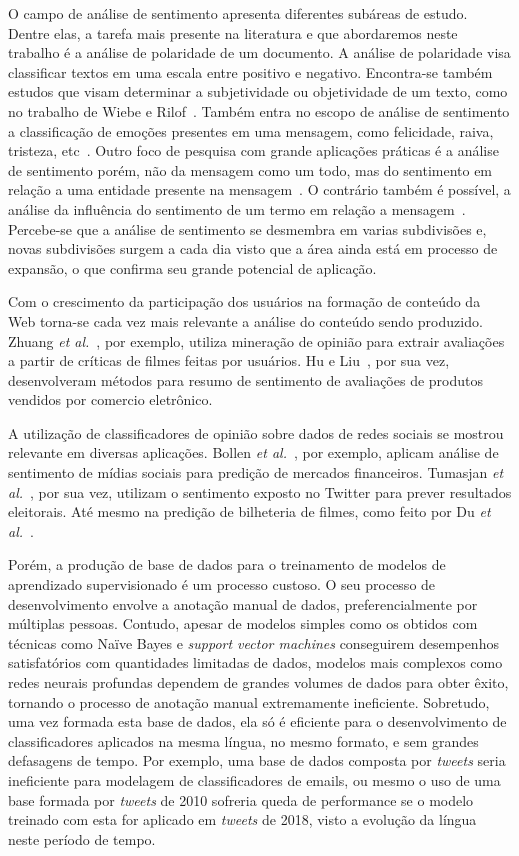 O campo de análise de sentimento apresenta diferentes subáreas de estudo.
Dentre elas, a tarefa mais presente na literatura e que abordaremos neste trabalho é a análise de polaridade de um
documento.
A análise de polaridade visa classificar textos em uma escala entre positivo e negativo.
Encontra-se também estudos que visam determinar a subjetividade ou objetividade de um texto, como no trabalho de Wiebe e
Rilof~\cite{Wiebe05}.
Também entra no escopo de análise de sentimento a classificação de emoções presentes em uma mensagem, como felicidade,
raiva, tristeza, etc~\cite{bollen11b}.
Outro foco de pesquisa com grande aplicações práticas é a análise de sentimento porém, não da mensagem como um todo, mas
do sentimento em relação a uma entidade presente na mensagem~\cite{eirinaki12}.
O contrário também é possível, a análise da influência do sentimento de um termo em relação a mensagem~\cite{socher13}.
Percebe-se que a análise de sentimento se desmembra em varias subdivisões e, novas subdivisões surgem a cada dia visto
que a área ainda está em processo de expansão, o que confirma seu grande potencial de aplicação.

Com o crescimento da participação dos usuários na formação de conteúdo da Web torna-se cada vez mais relevante a análise
do conteúdo sendo produzido.
Zhuang \textit{et al.}~\cite{zhuang06}, por exemplo, utiliza mineração de opinião para extrair avaliações a partir de
críticas de filmes feitas por usuários.
Hu e Liu~\cite{hu04}, por sua vez, desenvolveram métodos para resumo de sentimento de avaliações de produtos vendidos
por comercio eletrônico.

A utilização de classificadores de opinião sobre dados de redes sociais se mostrou relevante em diversas aplicações.
Bollen \textit{et al.}~\cite{bollen11}, por exemplo, aplicam análise de sentimento de mídias sociais para predição de
mercados financeiros.
Tumasjan \textit{et al.}~\cite{tumasjan10}, por sua vez, utilizam o sentimento exposto no Twitter para prever resultados
eleitorais.
Até mesmo na predição de bilheteria de filmes, como feito por Du \textit{et al.}~\cite{du14}.

Porém, a produção de base de dados para o treinamento de modelos de aprendizado supervisionado é um processo custoso.
O seu processo de desenvolvimento envolve a anotação manual de dados, preferencialmente por múltiplas pessoas.
Contudo, apesar de modelos simples como os obtidos com técnicas como Naïve Bayes e \textit{support vector machines}
conseguirem desempenhos satisfatórios com quantidades limitadas de dados, modelos mais complexos como redes neurais
profundas dependem de grandes volumes de dados para obter êxito, tornando o processo de anotação manual extremamente
ineficiente.
Sobretudo, uma vez formada esta base de dados, ela só é eficiente para o desenvolvimento de classificadores aplicados
na mesma língua, no mesmo formato, e sem grandes defasagens de tempo.
Por exemplo, uma base de dados composta por \textit{tweets} seria ineficiente para modelagem de classificadores de
emails, ou mesmo o uso de uma base formada por \textit{tweets} de 2010 sofreria queda de performance se o modelo
treinado com esta for aplicado em \textit{tweets} de 2018, visto a evolução da língua neste período de tempo.


